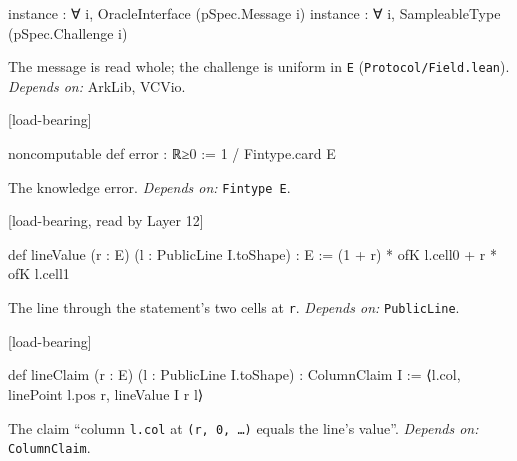 \begin{leancode}
instance : ∀ i, OracleInterface (pSpec.Message i)
instance : ∀ i, SampleableType (pSpec.Challenge i)
\end{leancode}


The message is read whole; the challenge is uniform in \texttt{E} (\texttt{Protocol/\allowbreak{}Field.\allowbreak{}lean}). \emph{Depends on:} ArkLib, VCVio.

\par\medskip\noindent\textbf{}\hfill\textsf{\small [load-bearing]}\par\nopagebreak

\begin{leancode}
noncomputable def error : ℝ≥0 := 1 / Fintype.card E
\end{leancode}


The knowledge error. \emph{Depends on:} \texttt{Fintype E}.

\par\medskip\noindent\textbf{}\hfill\textsf{\small [load-bearing, read by Layer 12]}\par\nopagebreak

\begin{leancode}
def lineValue (r : E) (l : PublicLine I.toShape) : E := (1 + r) * ofK l.cell0 + r * ofK l.cell1
\end{leancode}


The line through the statement's two cells at \texttt{r}. \emph{Depends on:} \texttt{PublicLine}.

\par\medskip\noindent\textbf{}\hfill\textsf{\small [load-bearing]}\par\nopagebreak

\begin{leancode}
def lineClaim (r : E) (l : PublicLine I.toShape) : ColumnClaim I := ⟨l.col, linePoint l.pos r, lineValue I r l⟩
\end{leancode}


The claim \enquote{column \texttt{l.\allowbreak{}col} at \texttt{(\allowbreak{}r,\allowbreak{} 0,\allowbreak{} …)} equals the line's value}. \emph{Depends on:} \texttt{ColumnClaim}.


